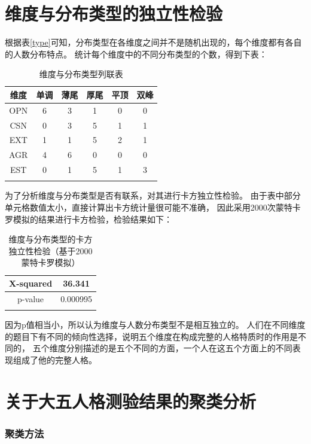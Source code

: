 \documentclass[UTF8]{ctexart}
\begin{document}
\part{维度与分布类型的独立性检验}
根据表\ref{type}可知，分布类型在各维度之间并不是随机出现的，每个维度都有各自的人数分布特点。
统计每个维度中的不同分布类型的个数，得到下表：
\begin{longtable}{c|c|c|c|c|c}
  \hline
  维度&单调&薄尾&厚尾&平顶&双峰\\\hline
  OPN&6&3&1&0&0\\
  CSN&0&3&5&1&1\\
  EXT&1&1&5&2&1\\
  AGR&4&6&0&0&0\\
  EST&0&1&5&1&3\\\hline
  \caption{维度与分布类型列联表}
\end{longtable}
为了分析维度与分布类型是否有联系，对其进行卡方独立性检验。
由于表中部分单元格数值太小，直接计算出卡方统计量很可能不准确，
因此采用2000次蒙特卡罗模拟的结果进行卡方检验，检验结果如下：
\begin{longtable}{c|c}
  \hline
  X-squared&36.341\\\hline
  p-value&0.000995\\\hline
  \caption{维度与分布类型的卡方独立性检验（基于2000蒙特卡罗模拟）}
\end{longtable}
因为p值相当小，所以认为维度与人数分布类型不是相互独立的。
人们在不同维度的题目下有不同的倾向性选择，说明五个维度在构成完整的人格特质时的作用是不同的，
五个维度分别描述的是五个不同的方面，一个人在这五个方面上的不同表现组成了他的完整人格。
\part{关于大五人格测验结果的聚类分析}
\setcounter{section}{0}
\section{聚类方法}
\end{document}
